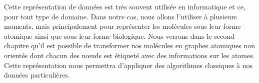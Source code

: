 Cette représentation de données est très souvent utilisée en informatique et ce, pour tout type de domaine.
Dans notre cas, nous allons l'utiliser à plusieurs moments, mais principalement pour représenter les molécules sous leur forme atomique ainsi que sous leur forme biologique.
Nous verrons dans le second chapitre qu'il est possible de transformer nos molécules en graphes atomiques non orientés dont chacun des n\oe{}uds est étiqueté avec des informations sur les atomes.
Cette représentation nous permettra d'appliquer des algorithmes classiques à nos données particulières.





























